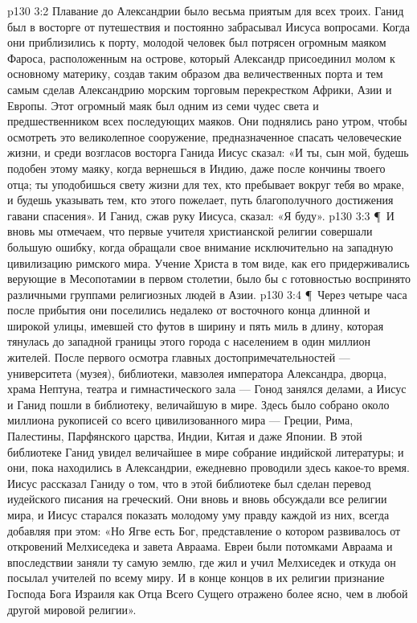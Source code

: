 \vs p130 3:2 Плавание до Александрии было весьма приятым для всех троих. Ганид был в восторге от путешествия и постоянно забрасывал Иисуса вопросами. Когда они приблизились к порту, молодой человек был потрясен огромным маяком Фароса, расположенным на острове, который Александр присоединил молом к основному материку, создав таким образом два величественных порта и тем самым сделав Александрию морским торговым перекрестком Африки, Азии и Европы. Этот огромный маяк был одним из семи чудес света и предшественником всех последующих маяков. Они поднялись рано утром, чтобы осмотреть это великолепное сооружение, предназначенное спасать человеческие жизни, и среди возгласов восторга Ганида Иисус сказал: «И ты, сын мой, будешь подобен этому маяку, когда вернешься в Индию, даже после кончины твоего отца; ты уподобишься свету жизни для тех, кто пребывает вокруг тебя во мраке, и будешь указывать тем, кто этого пожелает, путь благополучного достижения гавани спасения». И Ганид, сжав руку Иисуса, сказал: «Я буду».
\vs p130 3:3 \P\ И вновь мы отмечаем, что первые учителя христианской религии совершали большую ошибку, когда обращали свое внимание исключительно на западную цивилизацию римского мира. Учение Христа в том виде, как его придерживались верующие в Месопотамии в первом столетии, было бы с готовностью воспринято различными группами религиозных людей в Азии.
\vs p130 3:4 \P\ Через четыре часа после прибытия они поселились недалеко от восточного конца длинной и широкой улицы, имевшей сто футов в ширину и пять миль в длину, которая тянулась до западной границы этого города с населением в один миллион жителей. После первого осмотра главных достопримечательностей --- университета (музея), библиотеки, мавзолея императора Александра, дворца, храма Нептуна, театра и гимнастического зала --- Гонод занялся делами, а Иисус и Ганид пошли в библиотеку, величайшую в мире. Здесь было собрано около миллиона рукописей со всего цивилизованного мира --- Греции, Рима, Палестины, Парфянского царства, Индии, Китая и даже Японии. В этой библиотеке Ганид увидел величайшее в мире собрание индийской литературы; и они, пока находились в Александрии, ежедневно проводили здесь какое\hyp{}то время. Иисус рассказал Ганиду о том, что в этой библиотеке был сделан перевод иудейского писания на греческий. Они вновь и вновь обсуждали все религии мира, и Иисус старался показать молодому уму правду каждой из них, всегда добавляя при этом: «Но Ягве есть Бог, представление о котором развивалось от откровений Мелхиседека и завета Авраама. Евреи были потомками Авраама и впоследствии заняли ту самую землю, где жил и учил Мелхиседек и откуда он посылал учителей по всему миру. И в конце концов в их религии признание Господа Бога Израиля как Отца Всего Сущего отражено более ясно, чем в любой другой мировой религии».
